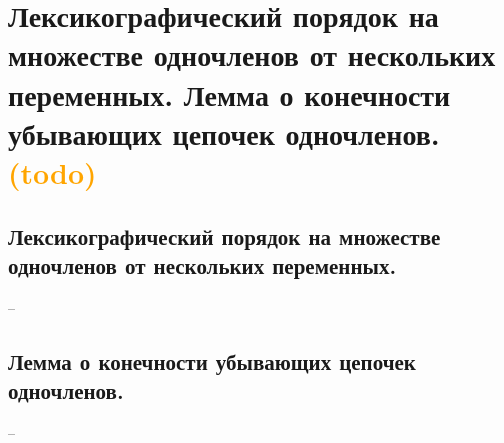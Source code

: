 \section{Лексикографический порядок на множестве одночленов от нескольких переменных. Лемма о конечности убывающих цепочек одночленов. \textcolor{orange}{(todo)}}

\subsection{Лексикографический порядок на множестве одночленов от нескольких 
переменных.}
--

\subsection{Лемма о конечности убывающих цепочек одночленов.}
--
